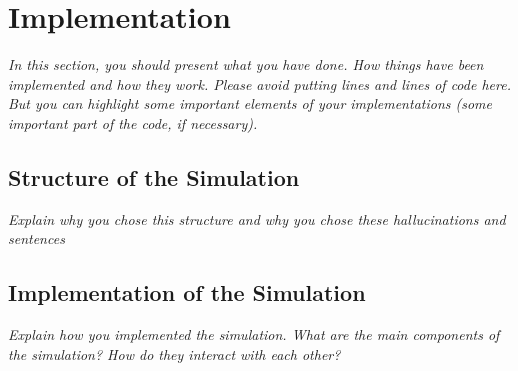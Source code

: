 \chapter{Implementation}
\label{ch:implementation}

\emph{In this section, you should present what you have done. How things have been implemented and how they work.
Please avoid putting lines and lines of code here. But you can highlight some important elements of your implementations (some important part of the code, if necessary).}

\section{Structure of the Simulation}
\emph{Explain why you chose this structure and why you chose these hallucinations and sentences}

\section{Implementation of the Simulation}
\emph{Explain how you implemented the simulation. What are the main components of the simulation? How do they interact with each other?}


